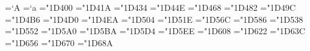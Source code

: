 %
%
%
%
%
%
%
%
%
\def\umathfixgreekromanuppercase{%
   \Umathcode "03A2 = 7 1 "03F4 %
}
\def\umathfixgreekromanlowercase{%
   \Umathcode "03CA = 7 1 "2202 %
   \Umathcode "03CB = 7 1 "03F5 %
   \Umathcode "03CC = 7 1 "03D1 %
   \Umathcode "03CD = 7 1 "03F0 %
   \Umathcode "03CE = 7 1 "03D5 %
   \Umathcode "03CF = 7 1 "03F1 %
   \Umathcode "03D0 = 7 1 "03D6 %
}

\chardef\ncharrmA=`A       \chardef\ncharrma=`a
\chardef\ncharbfA="1D400   \chardef\ncharbfa="1D41A
\chardef\ncharitA="1D434   \chardef\ncharita="1D44E
\chardef\ncharbiA="1D468   \chardef\ncharbia="1D482
\chardef\ncharclA="1D49C   \chardef\ncharcla="1D4B6
\chardef\ncharbcA="1D4D0   \chardef\ncharbca="1D4EA
\chardef\ncharfrA="1D504   \chardef\ncharfra="1D51E
\chardef\ncharbrA="1D56C   \chardef\ncharbra="1D586
\chardef\ncharbbA="1D538   \chardef\ncharbba="1D552
\chardef\ncharsnA="1D5A0   \chardef\ncharsna="1D5BA
\chardef\ncharbsA="1D5D4   \chardef\ncharbsa="1D5EE
\chardef\ncharsiA="1D608   \chardef\ncharsia="1D622
\chardef\ncharsxA="1D63C   \chardef\ncharsxa="1D656
\chardef\ncharttA="1D670   \chardef\nchartta="1D68A

